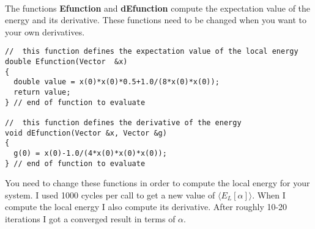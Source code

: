 \documentclass[%
twoside,                 %
final,                   %
10pt]{article}
\begin{document}
\paragraph{}
The functions \textbf{Efunction} and \textbf{dEfunction} compute the expectation value of the energy and its derivative.
These functions need to be changed when you want to your own derivatives.
\begin{verbatim}
//  this function defines the expectation value of the local energy
double Efunction(Vector  &x)
{
  double value = x(0)*x(0)*0.5+1.0/(8*x(0)*x(0));
  return value;
} // end of function to evaluate

//  this function defines the derivative of the energy 
void dEfunction(Vector &x, Vector &g)
{
  g(0) = x(0)-1.0/(4*x(0)*x(0)*x(0));
} // end of function to evaluate
\end{verbatim}
You need to change these functions in order to compute the local energy for your system. I used 1000
cycles per call to get a new value of $\langle E_L[\alpha]\rangle$.
When I compute the local energy I also compute its derivative.
After roughly 10-20 iterations I got a converged result in terms of $\alpha$.





\printindex
\end{document}
